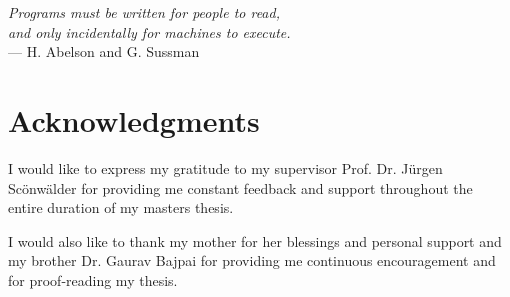 
\begin{flushright}{\slshape
    Programs must be written for people to read, \\
    and only incidentally for machines to execute.} \\ \medskip
    --- H. Abelson and G. Sussman
\end{flushright}

\bigskip

\begingroup
\let\clearpage\relax
\let\cleardoublepage\relax
\let\cleardoublepage\relax
\chapter*{Acknowledgments}

I would like to express my gratitude to my supervisor Prof. Dr. J\"urgen
Sc\"onw\"alder for providing me constant feedback and support throughout the
entire duration of my masters thesis.

I would also like to thank my mother for her blessings and personal support
and my brother Dr. Gaurav Bajpai for providing me continuous encouragement and
for proof-reading my thesis. \\

\endgroup
